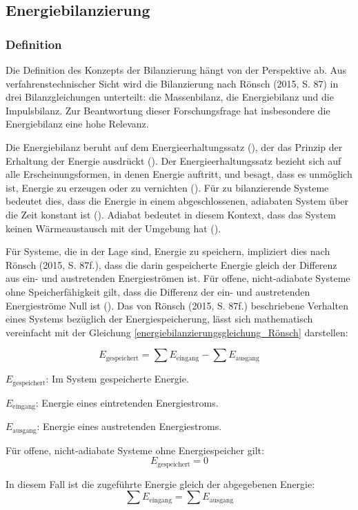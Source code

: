 \subsection{Energiebilanzierung}
\subsubsection{Definition}
Die Definition des Konzepts der Bilanzierung hängt von der Perspektive ab. Aus verfahrenstechnischer Sicht wird die Bilanzierung nach 
Rönsch (2015, S. 87) in drei Bilanzgleichungen unterteilt: die Massenbilanz, die Energiebilanz und die Impulsbilanz. 
Zur Beantwortung dieser Forschungsfrage hat insbesondere die Energiebilanz eine hohe Relevanz.

Die Energiebilanz beruht auf dem Energieerhaltungssatz (\cite[S. 87]{Rönsch.2015}), der das Prinzip der Erhaltung 
der Energie ausdrückt (\cite[S. 57]{Baehr.1966}). Der Energieerhaltungssatz bezieht sich auf alle Erscheinungsformen, in denen Energie auftritt, 
und besagt, dass es unmöglich ist, Energie zu erzeugen oder zu vernichten (\cite[S. 57]{Baehr.1966}). 
Für zu bilanzierende Systeme bedeutet dies, dass die Energie in einem abgeschlossenen, adiabaten System über die Zeit 
konstant ist (\cite[S. 87]{Rönsch.2015}). 
Adiabat bedeutet in diesem Kontext, dass das System keinen Wärmeaustausch mit der Umgebung hat (\cite[S. 87]{Rönsch.2015}). 

Für Systeme, die in der Lage sind, Energie zu speichern, impliziert dies nach Rönsch (2015, S. 87f.), 
dass die darin gespeicherte Energie gleich der Differenz aus ein- und austretenden Energieströmen ist. 
Für offene, nicht-adiabate Systeme ohne Speicherfähigkeit gilt, dass die Differenz der ein- und austretenden Energieströme Null ist 
(\cite[S. 87f.]{Rönsch.2015}).
Das von Rönsch (2015, S. 87f.) beschriebene Verhalten eines Systems bezüglich der Energiespeicherung, lässt sich mathematisch 
vereinfacht mit der Gleichung \eqref{energiebilanzierungsgleichung_Rönsch} darstellen:

\begin{equation}
E_{\text{gespeichert}} = \sum E_{\text{eingang}} - \sum E_{\text{ausgang}}
\label{energiebilanzierungsgleichung_Rönsch}
\end{equation}

\begin{description}
    \item \(E_{\text{gespeichert}}\): Im System gespeicherte Energie.
    \item \(E_{\text{eingang}}\): Energie eines eintretenden Energiestroms.
    \item \(E_{\text{ausgang}}\): Energie eines austretenden Energiestroms.
    \item Für offene, nicht-adiabate Systeme ohne Energiespeicher gilt:
    \[
    E_{\text{gespeichert}} = 0
    \]
    \item In diesem Fall ist die zugeführte Energie gleich der abgegebenen Energie:
    \[
    \sum E_{\text{eingang}} = \sum E_{\text{ausgang}}
    \]
\end{description}

